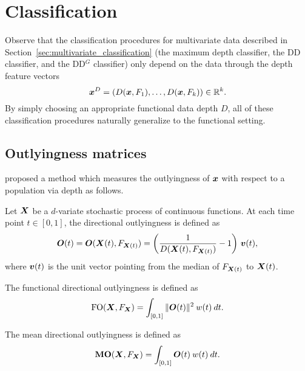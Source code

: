 \section{Classification}

Observe that the classification procedures for multivariate data described in
Section~\ref{sec:multivariate_classification} (the maximum depth classifier,
the DD classifier, and the DD$^G$ classifier) only depend on the data through
the depth feature vectors
\begin{equation}
    \bm{x}^D = (D(\bm{x}, F_1), \dots, D(\bm{x}, F_k)) \in \mathbb{R}^k.
\end{equation}
By simply choosing an appropriate functional data depth $D$, all of these
classification procedures naturally generalize to the functional setting.



\subsection{Outlyingness matrices}

\textcite{dai-genton-2018} proposed a method which measures the outlyingness
of $\bm{x}$ with respect to a population via depth as follows.

\begin{definition}
    Let $\bm{X}$ be a $d$-variate stochastic process of continuous functions.
    At each time point $t \in [0, 1]$, the directional outlyingness is defined
    as
    \begin{equation}
        \bm{O}(t) = \bm{O}(\bm{X}(t), F_{\bm{X}(t)}) = \left(\frac{1}{D(\bm{X}(t), F_{\bm{X}(t)})} - 1\right)\, \bm{v}(t),
    \end{equation}
    where $\bm{v}(t)$ is the unit vector pointing from the median of $F_{\bm{X}(t)}$
    to $\bm{X}(t)$.
\end{definition}

\begin{definition}
    The functional directional outlyingness is defined as
    \begin{equation}
        \operatorname{FO}(\bm{X}, F_{\bm{X}}) = \int_{[0, 1]} \Vert \bm{O}(t) \Vert^2 \:w(t)\:dt.
    \end{equation}
\end{definition}

\begin{definition}
    \label{def:MO}
    The mean directional outlyingness is defined as
    \begin{equation}
        \operatorname{\textbf{MO}}(\bm{X}, F_{\bm{X}}) = \int_{[0, 1]} \bm{O}(t) \:w(t)\:dt.
    \end{equation}
\end{definition}


